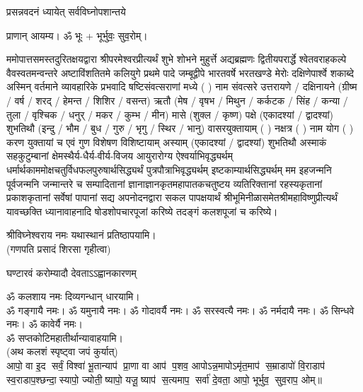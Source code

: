 {प्रसन्नवदनं ध्यायेत् सर्वविघ्नोपशान्तये}
 
प्राणान्  आयम्य।  ॐ भूः + भूर्भुवः॒ सुव॒रोम्।


ममोपात्तसमस्तदुरितक्षयद्वारा श्रीपरमेश्वरप्रीत्यर्थं शुभे शोभने मुहुर्त्ते अद्यब्रह्मणः
द्वितीयपरार्द्धे श्वेतवराहकल्पे वैवस्वतमन्वन्तरे अष्टाविंशतितमे कलियुगे प्रथमे पादे
जम्बूद्वीपे भारतवर्षे भरतखण्डे मेरोः दक्षिणेपार्श्वे शकाब्दे अस्मिन् वर्तमाने व्यावहारिके
 प्रभवादि षष्टिसंवत्सराणां मध्ये (	) नाम संवत्सरे उत्तरायणे / दक्षिनायने 
(ग्रीष्म / वर्ष / शरद् / हेमन्त / शिशिर / वसन्त) ऋतौ  (मेष / वृषभ / मिथुन / कर्कटक / सिंह / कन्या / तुला / 
वृश्चिक / धनुर् / मकर / कुम्भ / मीन) मासे (शुक्ल / कृष्ण) पक्षे (एकादश्यां / द्वादश्यां) शुभतिथौ
(इन्दु / भौम / बुध / गुरु / भृगु / स्थिर / भानु) वासरयुक्तायाम्
(  ) नक्षत्र (  ) नाम  योग  (  ) करण युक्तायां च एवं गुण विशेषण विशिष्टायाम्
अस्याम् (एकादश्यां / द्वादश्यां) शुभतिथौ 
अस्माकं सहकुटुम्बानां क्षेमस्थैर्य-धैर्य-वीर्य-विजय आयुरारोग्य ऐश्वर्याभिवृद्ध्यर्थम्
 धर्मार्थकाममोक्ष\-चतुर्विधफलपुरुषार्थसिद्ध्यर्थं पुत्रपौत्राभि\-वृद्ध्यर्थम् इष्टकाम्यार्थसिद्ध्यर्थम्
मम इहजन्मनि पूर्वजन्मनि जन्मान्तरे च सम्पादितानां ज्ञानाज्ञानकृतमहा\-पातकचतुष्टय
व्यतिरिक्तानां रहस्यकृतानां प्रकाशकृतानां सर्वेषां पापानां सद्य अपनोदनद्वारा सकल 
पापक्षयार्थं श्रीभूमिनीळासमेतश्रीमहाविष्णुप्रीत्यर्थं यावच्छक्ति ध्यानावाहनादि 
षोडशोपचारपूजां करिष्ये तदङ्गं कलशपूजां च करिष्ये।


श्रीविघ्नेश्वराय नमः यथास्थानं प्रतिष्ठापयामि।\\
(गणपति प्रसादं शिरसा गृहीत्वा)


{घण्टारवं करोम्यादौ देवताऽऽह्वानकारणम्}

ॐ कलशाय नमः दिव्यगन्धान् धारयामि।\\
ॐ गङ्गायै नमः। ॐ यमुनायै नमः। ॐ गोदावर्यै नमः।  ॐ सरस्वत्यै नमः। ॐ नर्मदायै नमः। ॐ सिन्धवे नमः। ॐ कावेर्यै नमः।\\
 ॐ सप्तकोटिमहातीर्थान्यावाहयामि। \\

(अथ कलशं स्पृष्ट्वा जपं कुर्यात्) \\
आपो॒ वा इ॒द सर्वं॒ विश्वा॑ भू॒तान्याप॑ प्रा॒णा वा आप॑ प॒शव॒ आपो\-ऽन्न॒मापोऽमृ॑त॒माप॑ स॒म्राडापो॑ वि॒राडाप॑ स्व॒राडाप॒श्\-छन्दा॒स्यापो॒ ज्योती॒ष्यापो॒ यजू॒ष्याप॑ स॒त्यमाप॒ सर्वा॑ दे॒वता॒ आपो॒ भूर्भुव॒ सुव॒राप॒ ओम्॥\\

